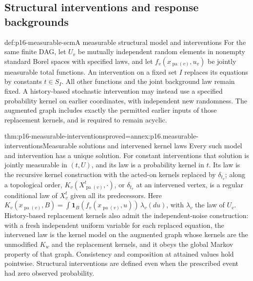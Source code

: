 \subsection{Structural interventions and response backgrounds}

\begin{hbdefinition}{def:p16-measurable-scm}{A measurable structural model and interventions}
For the same finite DAG, let \(U_v\) be mutually independent random
elements in nonempty standard Borel spaces with specified laws, and let
\(f_v(x_{\operatorname{pa}(v)},u_v)\) be jointly measurable total functions.
An intervention on a fixed set \(I\) replaces its equations by constants
\(t\in S_I\). All other functions and the joint background law remain
fixed. A history-based stochastic intervention may instead use a specified
probability kernel on earlier coordinates, with independent new randomness.
The augmented graph includes exactly the permitted earlier inputs of
those replacement kernels, and is required to remain acyclic.
\end{hbdefinition}

\begin{hbtheorem}{thm:p16-measurable-interventions}{proved=annex:p16.measurable-interventions}{Measurable solutions and intervened kernel laws}
Every such model and intervention has a unique solution. For constant
interventions that solution is jointly measurable in \((t,U)\), and its
law is a probability kernel in \(t\). Its law is the recursive kernel
construction with the acted-on kernels replaced by \(\delta_{t_v}\);
along a topological order, \(K_v(X^t_{\operatorname{pa}(v)},\cdot)\),
or \(\delta_{t_v}\) at an intervened vertex, is a regular conditional
law of \(X^t_v\) given all its predecessors. Here
\(K_v(x_{\operatorname{pa}(v)},B)=\int\mathbf 1_B(f_v(x_{\operatorname{pa}(v)},u))\,\lambda_v(du)\),
with \(\lambda_v\) the law of \(U_v\).
History-based replacement kernels also admit the independent-noise
construction: with a fresh independent uniform variable for each replaced
equation, the intervened law is the kernel model on the augmented graph
whose kernels are the unmodified \(K_w\) and the replacement kernels,
and it obeys the global Markov property of that graph.
Consistency and composition at attained values hold pointwise. Structural
interventions are defined even when the prescribed event had zero
observed probability.
\end{hbtheorem}

